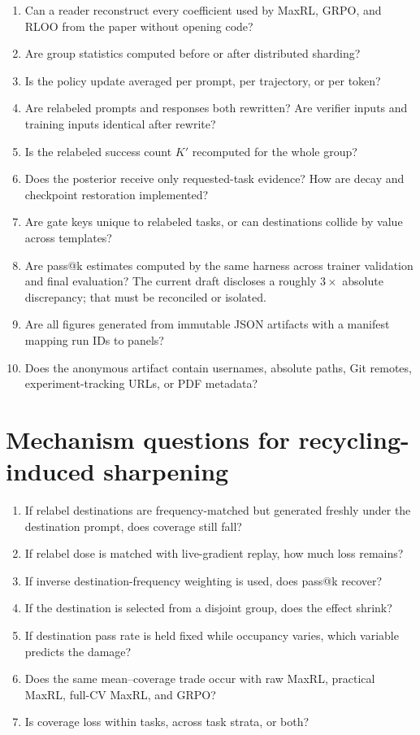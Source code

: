 \documentclass[11pt]{article}
\theoremstyle{definition}
\theoremstyle{remark}
\begin{document}
\begin{enumerate}[leftmargin=2em]
\item Can a reader reconstruct every coefficient used by MaxRL, GRPO, and RLOO from the paper without opening code?
\item Are group statistics computed before or after distributed sharding?
\item Is the policy update averaged per prompt, per trajectory, or per token?
\item Are relabeled prompts and responses both rewritten? Are verifier inputs and training inputs identical after rewrite?
\item Is the relabeled success count $K'$ recomputed for the whole group?
\item Does the posterior receive only requested-task evidence? How are decay and checkpoint restoration implemented?
\item Are gate keys unique to relabeled tasks, or can destinations collide by value across templates?
\item Are pass@k estimates computed by the same harness across trainer validation and final evaluation? The current draft discloses a roughly $3\times$ absolute discrepancy; that must be reconciled or isolated.
\item Are all figures generated from immutable JSON artifacts with a manifest mapping run IDs to panels?
\item Does the anonymous artifact contain usernames, absolute paths, Git remotes, experiment-tracking URLs, or PDF metadata?
\end{enumerate}

\section{Mechanism questions for recycling-induced sharpening}

\begin{questionbox}[title={\textbf{What would falsify the proposed mechanism?}}]
\begin{enumerate}[leftmargin=2em]
\item If relabel destinations are frequency-matched but generated freshly under the destination prompt, does coverage still fall?
\item If relabel dose is matched with live-gradient replay, how much loss remains?
\item If inverse destination-frequency weighting is used, does pass@k recover?
\item If the destination is selected from a disjoint group, does the effect shrink?
\item If destination pass rate is held fixed while occupancy varies, which variable predicts the damage?
\item Does the same mean--coverage trade occur with raw MaxRL, practical MaxRL, full-CV MaxRL, and GRPO?
\item Is coverage loss within tasks, across task strata, or both?
\end{enumerate}
\end{questionbox}
\end{document}
